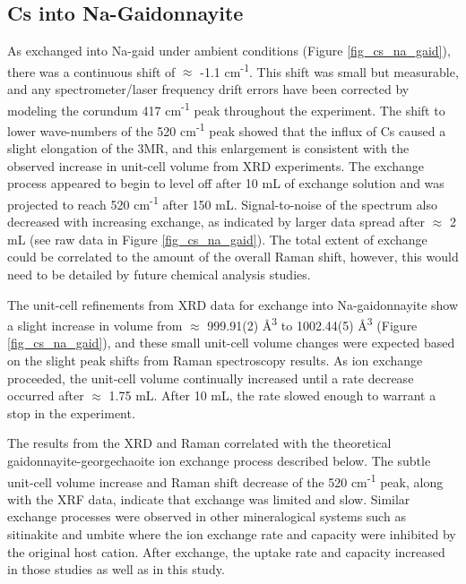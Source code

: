 \documentclass[journal=acsodf,manuscript=article]{achemso}
\begin{document}
\subsection{Cs into Na-Gaidonnayite}

{\label{sec_cs_na_gaid}}  %

As  exchanged into Na-gaid under ambient conditions
(Figure {\ref{fig_cs_na_gaid}}), there was a continuous shift
of \(\approx\) -1.1 cm\textsuperscript{-1}. This shift was small but
measurable, and any spectrometer/laser frequency drift errors have been
corrected by modeling the corundum 417 cm\textsuperscript{-1} peak
throughout the experiment.  The shift to lower wave-numbers of the 520
cm\textsuperscript{-1} peak showed that the influx of Cs caused a slight
elongation of the 3MR, and this enlargement is consistent with the
observed increase in unit-cell volume from XRD experiments. The exchange
process appeared to begin to level off after 10 mL of exchange solution
and was projected to reach 520 cm\textsuperscript{-1} after 150 mL. 
Signal-to-noise of the spectrum also decreased with increasing
 exchange, as indicated by larger data spread after
\(\approx\) 2 mL (see raw data in
Figure {\ref{fig_cs_na_gaid}}).  The total extent of exchange
could be correlated to the amount of the overall Raman shift, however,
this would need to be detailed by future chemical analysis studies. 

 

The unit-cell refinements from XRD data for 
exchange into Na-gaidonnayite show a slight increase in volume from
\(\approx\) 999.91(2) \AA\textsuperscript{3} to
1002.44(5) \AA\textsuperscript{3}
(Figure {\ref{fig_cs_na_gaid}}), and these small unit-cell
volume changes were expected based on the slight peak shifts from Raman
spectroscopy results.  As ion exchange proceeded, the unit-cell volume
continually increased until a rate decrease occurred after \(\approx\)
1.75 mL.  After 10 mL, the rate slowed enough to warrant a stop in the
experiment.

 

The results from the XRD and Raman correlated with the theoretical
gaidonnayite-georgechaoite ion exchange process described below.  The
subtle unit-cell volume increase and Raman shift decrease of the 520
cm\textsuperscript{-1} peak, along with the XRF data, indicate that
exchange was limited and slow.  Similar exchange processes were observed
in other mineralogical systems such as sitinakite and umbite where the
ion exchange rate and capacity were inhibited by the original
host \cite{Celestian2013,Celestian2007,Fewox2011}  cation.  After  exchange, the uptake rate and capacity increased in those studies as well as in
this study.
\end{document}
